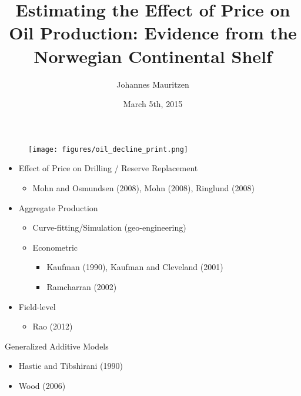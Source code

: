 \documentclass{beamer}
\title{Estimating the Effect of Price on Oil Production: Evidence from the Norwegian Continental Shelf}
\author{Johannes Mauritzen}
\institute %
{
 Department of Business and Management Science\\
 NHH Norwegian School of Economics
}
\date{March 5th, 2015}
\begin{document}
\begin{frame}[plain]
  \titlepage
\end{frame}

\begin{frame}
	\begin{figure}
		\texttt{[image: figures/oil\_decline\_print.png]}
		\label{oil_decline}
	\end{figure}
\end{frame}

\begin{frame}[plain]
	\begin{itemize}
		\item Effect of Price on Drilling / Reserve Replacement
			\begin{itemize} \item Mohn and Osmundsen (2008), Mohn (2008), Ringlund (2008) \end{itemize}
		 \item Aggregate Production

			\begin{itemize}
				\item Curve-fitting/Simulation (geo-engineering)
				\item Econometric
			
				\begin{itemize}
					\item Kaufman (1990), Kaufman and Cleveland (2001)
					\item Ramcharran (2002)
	 			\end{itemize}		
	 	\end{itemize}
	 	\item Field-level
	 			\begin{itemize}
	 				\item Rao (2012)
	 			\end{itemize}
	\end{itemize}
\end{frame}

\begin{frame}[plain]
	Generalized Additive Models
	\begin{itemize}
	\item  Hastie and Tibshirani (1990) 
	\item  Wood (2006)
	\end {itemize}
\end{frame}
\end{document}
